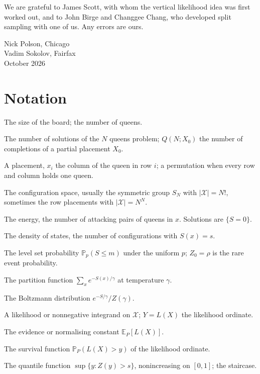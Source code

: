 \documentclass[11pt,twoside,openany]{book}
\theoremstyle{plain}
\theoremstyle{definition}
\theoremstyle{remark}
\newcommand{\PP}{\mathbb{P}}
\newcommand{\EE}{\mathbb{E}}
\newcommand{\cX}{\mathcal{X}}
\begin{document}
We are grateful to James Scott, with whom the vertical likelihood idea was first worked out, and to John Birge and Changgee Chang, who developed split sampling with one of us. Any errors are ours.

\bigskip
\noindent Nick Polson, Chicago\\
Vadim Sokolov, Fairfax\\
October 2026

\chapter*{Notation}

\begin{description}[style=nextline]
\item[$N$] The size of the board; the number of queens.
\item[$Q(N)$] The number of solutions of the $N$ queens problem; $Q(N; X_0)$ the number of completions of a partial placement $X_0$.
\item[$x = (x_1, \dots, x_N)$] A placement, $x_i$ the column of the queen in row $i$; a permutation when every row and column holds one queen.
\item[$\cX$] The configuration space, usually the symmetric group $S_N$ with $|\cX| = N!$, sometimes the row placements with $|\cX| = N^N$.
\item[$S(x)$] The energy, the number of attacking pairs of queens in $x$. Solutions are $\{ S = 0 \}$.
\item[$N(s)$] The density of states, the number of configurations with $S(x) = s$.
\item[$Z_m$] The level set probability $\PP_p(S \le m)$ under the uniform $p$; $Z_0 = \rho$ is the rare event probability.
\item[$Z(\gamma)$] The partition function $\sum_x e^{-S(x)/\gamma}$ at temperature $\gamma$.
\item[$\pi_\gamma$] The Boltzmann distribution $e^{-S/\gamma} / Z(\gamma)$.
\item[$L(x)$] A likelihood or nonnegative integrand on $\cX$; $Y = L(X)$ the likelihood ordinate.
\item[$Z$] The evidence or normalising constant $\EE_P[L(X)]$.
\item[$Z(y)$] The survival function $\PP_P(L(X) > y)$ of the likelihood ordinate.
\item[$\Lambda(s)$] The quantile function $\sup\{ y : Z(y) > s \}$, nonincreasing on $[0,1]$; the staircase.

\end{description}
\end{document}
